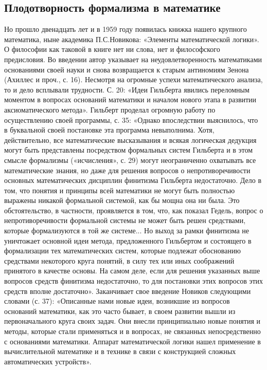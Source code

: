 \subsection{Плодотворность формализма в математике}

Но прошло двенадцать лет и в 1959 году появилась книжка нашего
крупного математика, ныне академика П.С.Новикова: «Элементы
математической логики». О философии как таковой в книге нет ни слова,
нет и философского предисловия. Во введении автор указывает на
неудовлетворенность математиками основаниями своей науки и снова
возвращается к старым антиномиям Зенона (Ахиллес и проч., с. 16).
Несмотря на огромные успехи математического анализа, то и дело
всплывали трудности. С. 20: «Идеи Гильберта явились переломным
моментом в вопросах оснований математики и началом нового этапа в
развитии аксиоматического метода». Гильберт проделал огромную работу
по осуществлению своей программы, с. 35: «Однако впоследствии
выяснилось, что в буквальной своей постановке эта программа
невыполнима. Хотя, действительно, все математические высказывания и
всякая логическая дедукция могут быть представлены посредством
формальных систем Гильберта и в этом смысле формализмы («исчисления»,
с. 29) могут неограниченно охватывать все математические знания, но
даже для решения вопросов о непротиворечивости основных математических
дисциплин финитизма Гильберта недостаточно. Дело в том, что понятия и
принципы всей математики не могут быть полностью выражены никакой
формальной системой, как бы мощна она ни была. Это обстоятельство, в
частности, проявляется в том, что, как показал Гедель, вопрос о
непротиворечивости формальной системы не может быть решен средствами,
которые формализуются в той же системе... Но выход за рамки финитизма
не уничтожает основной идеи метода, предложенного Гильбертом и
состоящего в формализации тех математических систем, которые подлежат
обоснованию средствами некоторого круга понятий, в силу тех или иных
соображений принятого в качестве основы. На самом деле, если для
решения указанных выше вопросов средств финитизма недостаточно, то для
постановки этих вопросов этих средств вполне достаточно». Заканчивает
свое введение Новиков следующими словами (с. 37): «Описанные нами
новые идеи, возникшие из вопросов оснований математики, как это часто
бывает, в своем развитии вышли из первоначального круга своих задач.
Они внесли принципиально новые понятия и методы, которые стали
применяться и в вопросах, не связанных непосредственно с основаниями
математики. Аппарат математической логики нашел применение в
вычислительной математике и в технике в связи с конструкцией сложных
автоматических устройств».

